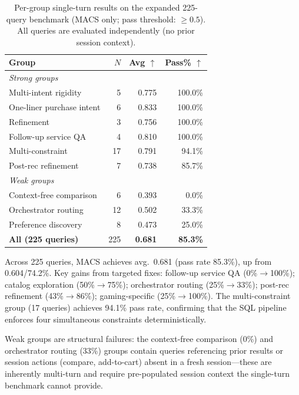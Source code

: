 \documentclass[sigconf,anonymous]{acmart}
\begin{document}
\begin{table}[t]
  \caption{Per-group single-turn results on the expanded 225-query benchmark
  (MACS only; pass threshold: $\geq 0.5$). All queries are evaluated
  independently (no prior session context).}
  \label{tab:groups}
  \begin{tabular}{lrrr}
    \toprule
    Group & $N$ & Avg $\uparrow$ & Pass\% $\uparrow$ \\
    \midrule
    \multicolumn{4}{l}{\textit{Strong groups}} \\
    Multi-intent rigidity      &  5 & 0.775 & 100.0\% \\
    One-liner purchase intent  &  6 & 0.833 & 100.0\% \\
    Refinement                 &  3 & 0.756 & 100.0\% \\
    Follow-up service QA       &  4 & 0.810 & 100.0\% \\
    Multi-constraint           & 17 & 0.791 &  94.1\% \\
    Post-rec refinement        &  7 & 0.738 &  85.7\% \\
    \midrule
    \multicolumn{4}{l}{\textit{Weak groups}} \\
    Context-free comparison    &  6 & 0.393 &   0.0\% \\
    Orchestrator routing       & 12 & 0.502 &  33.3\% \\
    Preference discovery       &  8 & 0.473 &  25.0\% \\
    \midrule
    \textbf{All (225 queries)} & 225 & \textbf{0.681} & \textbf{85.3\%} \\
    \bottomrule
  \end{tabular}
\end{table}

Across 225 queries, MACS achieves avg.\ 0.681 (pass rate 85.3\%), up from
0.604/74.2\%. Key gains from targeted fixes: follow-up service QA
(0\%$\to$100\%); catalog exploration (50\%$\to$75\%); orchestrator routing
(25\%$\to$33\%); post-rec refinement (43\%$\to$86\%); gaming-specific
(25\%$\to$100\%). The multi-constraint group (17 queries) achieves 94.1\%
pass rate, confirming that the SQL pipeline enforces four simultaneous
constraints deterministically.

Weak groups are structural failures: the context-free comparison (0\%) and
orchestrator routing (33\%) groups contain queries referencing prior results
or session actions (compare, add-to-cart) absent in a fresh session---these
are inherently multi-turn and require pre-populated session context the
single-turn benchmark cannot provide.
\end{document}

